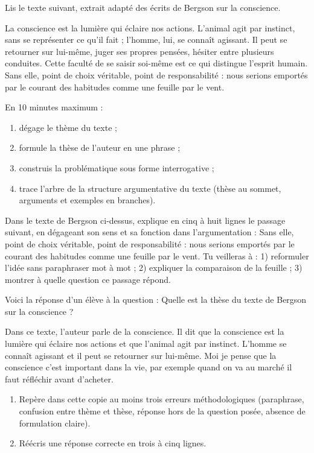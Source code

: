 \documentclass[11pt]{article}
\begin{document}
\begin{exercice}
Lis le texte suivant, extrait adapté des écrits de Bergson sur la conscience.

\og La conscience est la lumière qui éclaire nos actions. L'animal agit par instinct, sans se représenter ce qu'il fait ; l'homme, lui, se connaît agissant. Il peut se retourner sur lui-même, juger ses propres pensées, hésiter entre plusieurs conduites. Cette faculté de se saisir soi-même est ce qui distingue l'esprit humain. Sans elle, point de choix véritable, point de responsabilité : nous serions emportés par le courant des habitudes comme une feuille par le vent. \fg

En 10 minutes maximum :
\begin{enumerate}
\item dégage le thème du texte ;
\item formule la thèse de l'auteur en une phrase ;
\item construis la problématique sous forme interrogative ;
\item trace l'arbre de la structure argumentative du texte (thèse au sommet, arguments et exemples en branches).
\end{enumerate}
\end{exercice}

\begin{exercice}
Dans le texte de Bergson ci-dessus, explique en cinq à huit lignes le passage suivant, en dégageant son sens et sa fonction dans l'argumentation : \og Sans elle, point de choix véritable, point de responsabilité : nous serions emportés par le courant des habitudes comme une feuille par le vent. \fg
Tu veilleras à : 1) reformuler l'idée sans paraphraser mot à mot ; 2) expliquer la comparaison de la feuille ; 3) montrer à quelle question ce passage répond.
\end{exercice}

\begin{exercice}
Voici la réponse d'un élève à la question : \og Quelle est la thèse du texte de Bergson sur la conscience ? \fg

\og Dans ce texte, l'auteur parle de la conscience. Il dit que la conscience est la lumière qui éclaire nos actions et que l'animal agit par instinct. L'homme se connaît agissant et il peut se retourner sur lui-même. Moi je pense que la conscience c'est important dans la vie, par exemple quand on va au marché il faut réfléchir avant d'acheter. \fg

\begin{enumerate}
\item Repère dans cette copie au moins trois erreurs méthodologiques (paraphrase, confusion entre thème et thèse, réponse hors de la question posée, absence de formulation claire).
\item Réécris une réponse correcte en trois à cinq lignes.
\end{enumerate}
\end{exercice}
\end{document}
